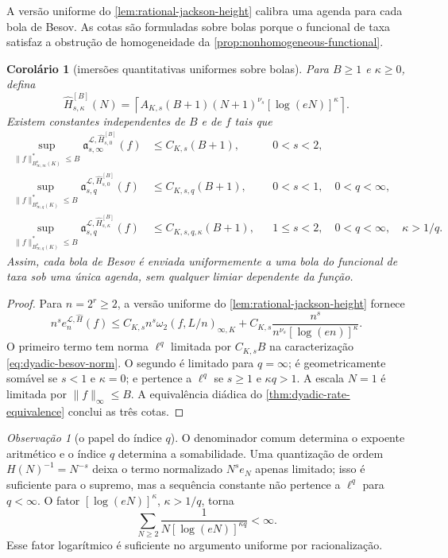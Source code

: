 \documentclass[11pt,a4paper]{article}
\newtheorem{corollary}[theorem]{Corolário}
\theoremstyle{definition}
\theoremstyle{remark}
\newtheorem{remark}[theorem]{Observação}
\newcommand{\Library}{\mathcal{L}}
\begin{document}
A versão uniforme do \cref{lem:rational-jackson-height} calibra uma agenda para cada bola de Besov. As cotas são formuladas sobre bolas porque o funcional de taxa satisfaz a obstrução de homogeneidade da \cref{prop:nonhomogeneous-functional}.

\begin{corollary}[imersões quantitativas uniformes sobre bolas]
\label{cor:uniform-besov-ball-embedding}
Para $B\ge1$ e $\kappa\ge0$, defina
\begin{equation}
 \widehat H_{s,\kappa}^{[B]}(N)
 =\left\lceil A_{K,s}(B+1)(N+1)^{\nu_s}
        [\log(eN)]^\kappa\right\rceil .
 \label{eq:ball-calibrated-height-schedule}
\end{equation}
Existem constantes independentes de $B$ e de $f$ tais que
\begin{align}
 \sup_{\|f\|_{B^s_{\infty,\infty}(K)}^*\le B}
 \mathfrak a_{s,\infty}^{\Library,
       \widehat H_{s,0}^{[B]}}(f)
 &\le C_{K,s}(B+1), &&0<s<2,\label{eq:uniform-ball-endpoint}\\
 \sup_{\|f\|_{B^s_{\infty,q}(K)}^*\le B}
 \mathfrak a_{s,q}^{\Library,
       \widehat H_{s,0}^{[B]}}(f)
 &\le C_{K,s,q}(B+1), &&0<s<1,\quad0<q<\infty,
 \label{eq:uniform-ball-subcritical}\\
 \sup_{\|f\|_{B^s_{\infty,q}(K)}^*\le B}
 \mathfrak a_{s,q}^{\Library,
       \widehat H_{s,\kappa}^{[B]}}(f)
 &\le C_{K,s,q,\kappa}(B+1),
 &&1\le s<2,\quad0<q<\infty,\quad\kappa>1/q.
 \label{eq:uniform-ball-critical}
\end{align}
Assim, cada bola de Besov é enviada uniformemente a uma bola do funcional de
taxa sob uma única agenda, sem qualquer limiar dependente da função.
\end{corollary}

\begin{proof}
Para $n=2^r\ge2$, a versão uniforme do
\cref{lem:rational-jackson-height} fornece
\[
 n^s e_n^{\Library,\widehat H}(f)
 \le C_{K,s}n^s\omega_2(f,L/n)_{\infty,K}
 +C_{K,s}\frac{n^s}{n^{\nu_s}[\log(en)]^\kappa}.
\]
O primeiro termo tem norma $\ell^q$ limitada por $C_{K,s}B$ na
caracterização \eqref{eq:dyadic-besov-norm}. O segundo é limitado para
$q=\infty$; é geometricamente somável se $s<1$ e $\kappa=0$; e pertence a
$\ell^q$ se $s\ge1$ e $\kappa q>1$. A escala $N=1$ é limitada por
$\|f\|_\infty\le B$. A equivalência diádica do
\cref{thm:dyadic-rate-equivalence} conclui as três cotas.
\end{proof}

\begin{remark}[o papel do índice $q$]
\label{rem:q-height-role}
O denominador comum determina o expoente aritmético e o índice $q$ determina
a somabilidade. Uma quantização de ordem
$H(N)^{-1}=N^{-s}$ deixa o termo normalizado $N^se_N$ apenas limitado; isso
é suficiente para o supremo, mas a sequência constante não pertence a
$\ell^q$ para $q<\infty$. O fator $[\log(eN)]^\kappa$, $\kappa>1/q$, torna
\[
 \sum_{N\ge2}\frac1{N[\log(eN)]^{\kappa q}}<\infty.
\]
Esse fator logarítmico é suficiente no argumento uniforme por
racionalização.
\end{remark}
\end{document}

